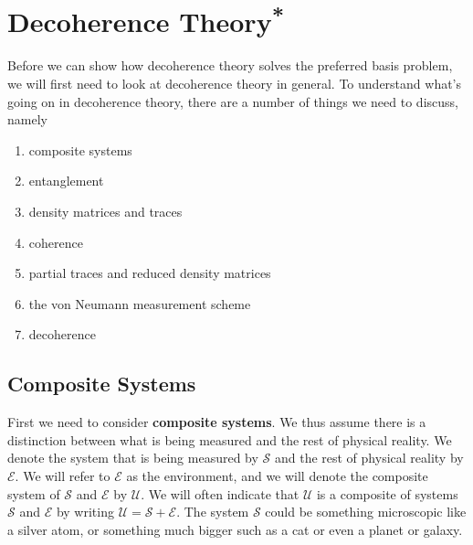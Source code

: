 \documentclass[12pt]{report}
\begin{document}

  
     

      
    \section{Decoherence Theory\label{decotheory}\textsuperscript{*}\protect\footnotemark}\renewcommand{\thefootnote}{\fnsymbol{footnote}}\renewcommand*{\thefootnote}{\arabic{footnote}}Before we can show how decoherence theory solves the preferred basis problem, we will first need to look at decoherence theory in general. To understand what's going on in decoherence theory, there are a number of things we need to discuss, namely
    \begin{enumerate}[noitemsep, nosep, topsep=0pt]
    \item composite systems
    \item entanglement
    \item density matrices and traces 
    \item coherence
    \item partial traces and reduced density matrices
    \item the von Neumann measurement scheme
    \item decoherence
    \end{enumerate}
    \subsection{Composite Systems} First we need to consider \textbf{composite systems}. We thus assume there is a distinction between what is being measured and the rest of physical reality. We denote the system that is being measured by $\mathcal{S}$ %
%
and the rest of physical reality by $\mathcal{E}$. %
%
We will refer to $\mathcal{E}$ as the environment, and we will denote the composite system of $\mathcal{S}$ and $\mathcal{E}$ by $\mathcal{U}$. We will often indicate that $\mathcal{U}$ %
%
is a composite of systems $\mathcal{S}$ and $\mathcal{E}$ by writing $\mathcal{U}=\mathcal{S}+\mathcal{E}$. The system $\mathcal{S}$ could be something microscopic like a silver atom, or something much bigger such as a cat or even a planet or galaxy.
    
\end{document}
